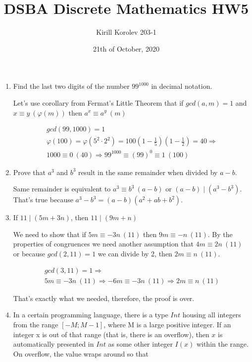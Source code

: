 \documentclass{article}
\title{DSBA Discrete Mathematics HW5}
\author{Kirill Korolev 203-1}
\date{21th of October, 2020}
\begin{document}
\maketitle

\begin{enumerate}
\item Find the last two digits of the number $99^{1000}$ in decimal notation.

Let's use corollary from Fermat's Little Theorem that if $gcd(a,m)=1$ and $x \equiv y\:(\varphi(m))$ then $a^x \equiv a^y \:(m)$

\begin{align*}
gcd(99,1000) = 1\\
\varphi(100) = \varphi(5^2 \cdot 2^2) = 100(1 - \frac{1}{5})(1 - \frac{1}{2}) = 40 \Rightarrow\\
1000 \equiv 0 \: (40) \Rightarrow 99^{1000} \equiv (99)^0 \equiv 1 \: (100)
\end{align*}

\item Prove that $a^3$ and $b^3$ result in the same remainder when divided by $a - b$.

Same remainder is equivalent to $a^3 \equiv b^3 \: (a - b)$ or $(a - b) \mid (a^3 - b^3)$. That's true because $a^3 - b^3 = (a - b)(a^2 + ab + b^2)$.

\item If $11 \mid (5m + 3n)$, then $11 \mid (9m + n)$

We need to show that if $5m \equiv -3n \: (11)$ then $9m \equiv -n \: (11)$. By the properties of congruences we need another assumption that $4m \equiv 2n \: (11)$ or because $gcd(2, 11) = 1$ we can divide by 2, then $2m \equiv n \: (11)$.

\begin{align*}
gcd(3,11) = 1 \Rightarrow\\
5m \equiv -3n \: (11) \Rightarrow -6m \equiv -3n \: (11) \Rightarrow 2m \equiv n \: (11)
\end{align*}

That's exactly what we needed, therefore, the proof is over.

\item In a certain programming language, there is a type $Int$ housing all integers from the range $[-M; M - 1]$,
where M is a large positive integer. If an integer x is out of that range (that is, there is an overflow), then $x$
is automatically presented in $Int$ as some other integer $I(x)$ within the range. On overflow, the value wraps
around so that


\end{enumerate}
\end{document}
